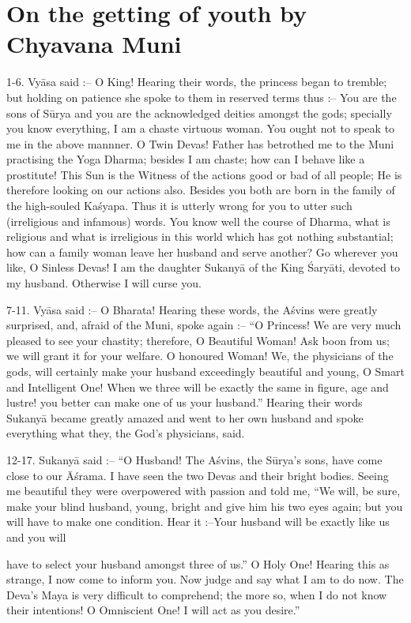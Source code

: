 \chapter{On the getting of youth by Chyavana Muni}

1-6. Vy\=asa said :-- O King! Hearing their words, the princess began to tremble; but holding on patience she spoke to them in reserved terms thus :-- You are the sons of S\=urya and you are the acknowledged deities amongst the gods; specially you know everything, I am a chaste virtuous woman. You ought not to speak to me in the above mannner. O Twin Devas! Father has betrothed me to the Muni practising the Yoga Dharma; besides I am chaste; how can I behave like a prostitute! This Sun is the Witness of the actions good or bad of all people; He is therefore looking on our actions also. Besides you both are born in the family of the high-souled Ka\'syapa. Thus it is utterly wrong for you to utter such (irreligious and infamous) words. You know well the course of Dharma, what is religious and what is irreligious in this world which has got nothing substantial; how can a family woman leave her husband and serve another? Go wherever you like, O Sinless Devas! I am the daughter Sukany\=a of the King \'Sary\=ati, devoted to my husband. Otherwise I will curse you.

7-11. Vy\=asa said :-- O Bharata! Hearing these words, the A\'svins were greatly surprised, and, afraid of the Muni, spoke again :-- ``O Princess! We are very much pleased to see your chastity; therefore, O Beautiful Woman! Ask boon from us; we will grant it for your welfare. O honoured Woman! We, the physicians of the gods, will certainly make your husband exceedingly beautiful and young, O Smart and Intelligent One! When we three will be exactly the same in figure, age and lustre! you better can make one of us your husband.'' Hearing their words Sukany\=a became greatly amazed and went to her own husband and spoke everything what they, the God's physicians, said.

12-17. Sukany\=a said :-- ``O Husband! The A\'svins, the S\=urya's sons, have come close to our \=A\'srama. I have seen the two Devas and their bright bodies. Seeing me beautiful they were overpowered with passion and told me, ``We will, be sure, make your blind husband, young, bright and give him his two eyes again; but you will have to make one condition. Hear it :--Your husband will be exactly like us and you will

have to select your husband amongst three of us.'' O Holy One! Hearing this as strange, I now come to inform you. Now judge and say what I am to do now. The Deva's Maya is very difficult to comprehend; the more so, when I do not know their intentions! O Omniscient One! I will act as you desire.''

